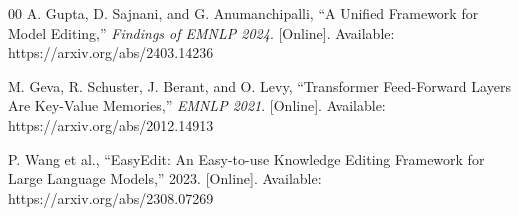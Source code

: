 \documentclass[conference]{IEEEtran}
\begin{document}
\begin{thebibliography}{00}
     A. Gupta, D. Sajnani, and G. Anumanchipalli, ``A Unified Framework for Model Editing,'' \textit{Findings of EMNLP 2024}. [Online]. Available: https://arxiv.org/abs/2403.14236

     M. Geva, R. Schuster, J. Berant, and O. Levy, ``Transformer Feed-Forward Layers Are Key-Value Memories,'' \textit{EMNLP 2021}. [Online]. Available: https://arxiv.org/abs/2012.14913

 P. Wang et al., ``EasyEdit: An Easy-to-use Knowledge Editing Framework for Large Language Models,'' 2023. [Online]. Available: https://arxiv.org/abs/2308.07269
\end{thebibliography}
\end{document}
